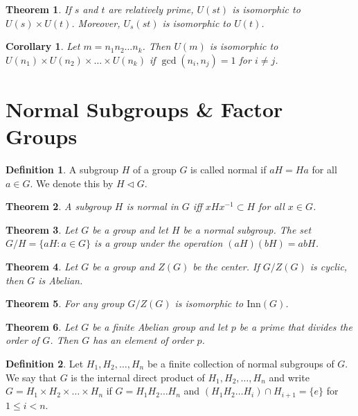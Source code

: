 \documentclass{article}
\newtheorem{theorem}{Theorem}[section]
\newtheorem*{corollary}{Corollary}
\theoremstyle{definition}
\newtheorem*{definition}{Definition}
\begin{document}
\begin{theorem}
    If $s$ and $t$ are relatively prime, $U(st)$ is isomorphic to $U(s) \times U(t)$. Moreover, $U_s(st)$ is isomorphic to $U(t)$.
\end{theorem}

\begin{corollary}
    Let $m = n_1n_2\dots n_k$. Then $U(m)$ is isomorphic to $U(n_1) \times U(n_2) \times \dots \times U(n_k)$ if $\gcd(n_i, n_j) = 1$ for $i \neq j$.
\end{corollary}

\section{Normal Subgroups \& Factor Groups}

\begin{definition}
    A subgroup $H$ of a group $G$ is called normal if $aH = Ha$ for all $a \in G$. We denote this by $H \lhd G$.
\end{definition}

\begin{theorem}
    A subgroup $H$ is normal in $G$ iff $xHx^{-1} \subset H$ for all $x \in G$.
\end{theorem}

\begin{theorem}
    Let $G$ be a group and let $H$ be a normal subgroup. The set $G/H = \{aH : a \in G\}$ is a group under the operation $(aH)(bH) = abH$.
\end{theorem}

\begin{theorem}
    Let $G$ be a group and $Z(G)$ be the center. If $G/Z(G)$ is cyclic, then $G$ is Abelian. 
\end{theorem}

\begin{theorem}
    For any group $G/Z(G)$ is isomorphic to $\text{Inn}(G)$.
\end{theorem}

\begin{theorem}
    Let $G$ be a finite Abelian group and let $p$ be a prime that divides the order of $G$. Then $G$ has an element of order $p$.
\end{theorem}

\begin{definition}
    Let $H_1, H_2, \dots, H_n$ be a finite collection of normal subgroups of $G$. We say that $G$ is the internal direct product of $H_1, H_2, \dots, H_n$ and write $G = H_1 \times H_2 \times \dots \times H_n$ if $G = H_1H_2\dots H_n$ and $(H_1H_2\dots H_i) \cap H_{i+1} = \{e\}$ for $1 \leq i < n$.
\end{definition}
\end{document}

